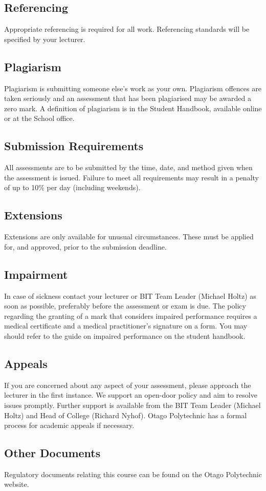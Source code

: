 \documentclass{article}
\begin{document}
\subsection*{Referencing}
Appropriate referencing is required for all work. Referencing standards will be specified by your lecturer.

\subsection*{Plagiarism}
Plagiarism is submitting someone else’s work as your own. Plagiarism offences are taken seriously and an assessment that has been plagiarised may be awarded a zero mark. A definition of plagiarism is in the Student Handbook, available online or at the School office.

\subsection*{Submission Requirements}
All assessments are to be submitted by the time, date, and method given when the assessment is issued. Failure to meet all requirements may result in a penalty of up to 10\% per day (including weekends).

\subsection*{Extensions}
Extensions are only available for unusual circumstances. These must be applied for, and approved, prior to the submission deadline.

\subsection*{Impairment}
In case of sickness contact your lecturer or BIT Team Leader (Michael Holtz) as soon as possible, preferably before the assessment or exam is due. The policy regarding the granting of a mark that considers impaired performance requires a medical certificate and a medical practitioner’s signature on a form. You may should refer to the guide on impaired performance on the student handbook.

\subsection*{Appeals}
If you are concerned about any aspect of your assessment, please approach the lecturer in the first instance. We support an open-door policy and aim to resolve issues promptly. Further support is available from the BIT Team Leader (Michael Holtz) and Head of College (Richard Nyhof). Otago Polytechnic has a formal process for academic appeals if necessary.

\subsection*{Other Documents}
Regulatory documents relating this course can be found on the Otago Polytechnic website.
\end{document}
